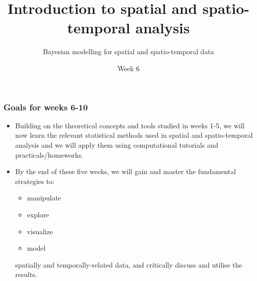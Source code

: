 \documentclass[12pt]{beamer}
\title{Introduction to spatial and spatio-temporal analysis}
\subtitle{}
\author{Bayesian modelling for spatial and spatio-temporal data}
\institute{MSc in Epidemiology}
\date{Week 6}
\begin{document}
\begin{frame}[t]
  \titlepage
\end{frame}


\begin{frame}
\frametitle{Goals for weeks 6-10}
\begin{itemize} [label=] \setlength\itemsep{\fill}
\item Building on the theoretical concepts and tools studied in weeks 1-5, we will now learn the relevant statistical methods used in spatial and spatio-temporal analysis and we will apply  them using computational tutorials and practicals/homeworks.
\item By the end of these five weeks, we will gain and master the fundamental strategies to:
\begin{itemize} [label=] \setlength\itemsep{\fill}
  \item \alert{manipulate}
  \item \alert{explore}
  \item \alert{visualize}
  \item \alert{model}
\end{itemize}
spatially and temporally-related data, and \alert{critically discuss and utilise the results}. 
\end{itemize}
\end{frame}

\end{document}
